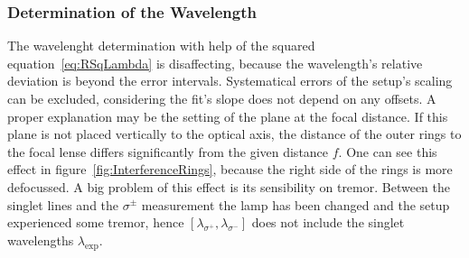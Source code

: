 \subsubsection{Determination of the Wavelength}
\label{toc:PlausibilityWavelength}
The wavelenght determination with help of the squared equation~\ref{eq:RSqLambda} is disaffecting, because the wavelength's relative deviation is beyond the error intervals.
Systematical errors of the setup's scaling can be excluded, considering the fit's slope does not depend on any offsets.
A proper explanation may be the setting of the plane at the focal distance. 
If this plane is not placed vertically to the optical axis, the distance of the outer rings to the focal lense differs significantly from the given distance $f$.
One can see this effect in figure~\ref{fig:InterferenceRings}, because the right side of the rings is more defocussed.
A big problem of this effect is its sensibility on tremor.
Between the singlet lines and the $\sigma^{\pm}$ measurement the lamp has been changed and the setup experienced some tremor, hence $\left[\lambda_{\sigma^+}, \lambda_{\sigma^-}\right]$ does not include the singlet wavelengths $\lambda_{\text{exp}}$.
